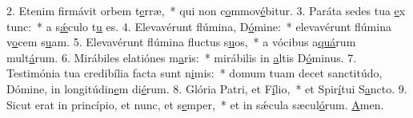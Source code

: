 2. Etenim firmávit orbem t\uline{e}rræ,~* qui non c\uline{o}mmov\uline{é}bitur.
3. Paráta sedes tua \uline{e}x tunc:~* a s\uline{ǽ}culo t\uline{u} es.
4. Elevavérunt flúmina, D\uline{ó}mine:~* elevavérunt flúmina v\uline{o}cem s\uline{u}am.
5. Elevavérunt flúmina fluctus s\uline{u}os,~* a vócibus a\uline{quá}rum mult\uline{á}rum.
6. Mirábiles elatiónes m\uline{a}ris:~* mirábilis in \uline{a}ltis D\uline{ó}minus.
7. Testimónia tua credibília facta sunt n\uline{i}mis:~* domum tuam decet sanctitúdo, Dómine, in longitúdin\uline{e}m di\uline{é}rum.
8. Glória Patri, et F\uline{í}lio,~* et Spir\uline{í}tui S\uline{a}ncto.
9. Sicut erat in princípio, et nunc, et s\uline{e}mper,~* et in sǽcula sæcul\uline{ó}rum. \uline{A}men.
